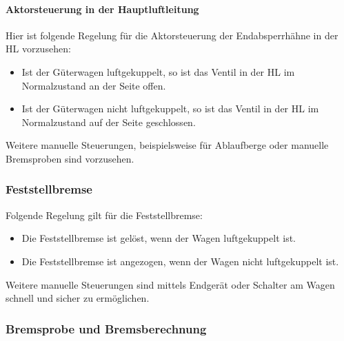 \paragraph{Aktorsteuerung in der Hauptluftleitung}
\begin{feat}
Hier ist folgende Regelung für die Aktorsteuerung der Endabsperrhähne in der \acrshort{HL} vorzusehen:
\begin{itemize}
    \item Ist der Güterwagen luftgekuppelt, so ist das Ventil in der \acrshort{HL} im Normalzustand an der Seite offen.
    \item Ist der Güterwagen nicht luftgekuppelt, so ist das Ventil in der \acrshort{HL} im Normalzustand auf der Seite geschlossen.
\end{itemize}
\end{feat}
\begin{rem} [zu Anf. 43]
Weitere manuelle Steuerungen, beispielsweise für Ablaufberge oder manuelle Bremsproben sind vorzusehen.
\end{rem}


\subsubsection{Feststellbremse}
\begin{feat}
Folgende Regelung gilt für die Feststellbremse:
\begin{itemize}
    \item Die Feststellbremse ist gelöst, wenn der Wagen luftgekuppelt ist.
    \item Die Feststellbremse ist angezogen, wenn der Wagen nicht luftgekuppelt ist.
\end{itemize}
\end{feat}
\begin{rem} [zu Anf. 44]
Weitere manuelle Steuerungen sind mittels Endgerät oder \newline Schalter am Wagen schnell und sicher zu ermöglichen.
\end{rem}

\subsubsection{Bremsprobe und Bremsberechnung}
